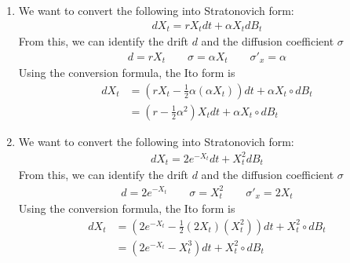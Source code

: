 \documentclass[12pt]{article}
\theoremstyle{plain}
\theoremstyle{definition}
\theoremstyle{remark}
\begin{document}
\begin{enumerate}
\begin{enumerate}
      \item %
        We want to convert the following into Stratonovich form:
        \begin{align*}
          dX_t = r X_t dt + \alpha X_t dB_t
        \end{align*}
        From this, we can identify the drift $d$ and the diffusion
        coefficient $\sigma$
        \begin{align*}
          d = rX_t \qquad
          \sigma = \alpha X_t \qquad
          \sigma'_x = \alpha
        \end{align*}
        Using the conversion formula, the Ito form is
        \begin{align*}
          dX_t
          &= \left( rX_t - \frac{1}{2} \alpha (\alpha X_t)\right)dt
          + \alpha X_t \circ dB_t \\
          &= \left( r - \frac{1}{2} \alpha^2 \right)X_t dt
          + \alpha X_t \circ dB_t
        \end{align*}

      \item %
        We want to convert the following into Stratonovich form:
        \begin{align*}
          dX_t = 2e^{-X_t} dt + X^2_t dB_t
        \end{align*}
        From this, we can identify the drift $d$ and the diffusion
        coefficient $\sigma$
        \begin{align*}
          d = 2e^{-X_t} \qquad
          \sigma = X^2_t \qquad
          \sigma'_x = 2X_t
        \end{align*}
        Using the conversion formula, the Ito form is
        \begin{align*}
          dX_t
          &= \left( 2e^{-X_t} - \frac{1}{2} (2X_t) (X_t^2)\right)dt
            + X^2_t \circ dB_t \\
          &= \left( 2e^{-X_t} - X^3_t\right)dt
            + X^2_t \circ dB_t
        \end{align*}

    \end{enumerate}


\end{enumerate}
\end{document}
